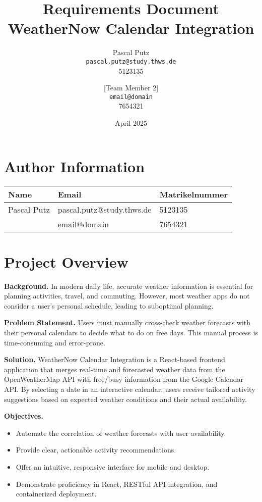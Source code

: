 \documentclass[12pt,a4paper]{article}
\title{Requirements Document\\\large WeatherNow Calendar Integration}
\author{
  Pascal Putz \\ \texttt{pascal.putz@study.thws.de} \\ 5123135
  \and
  [Team Member 2] \\ \texttt{email@domain} \\ 7654321
}
\date{April 2025}
\begin{document}
\maketitle

\section{Author Information}
\begin{longtable}{|p{5cm}|p{6cm}|p{3cm}|}
\hline
\textbf{Name} & \textbf{Email} & \textbf{Matrikelnummer} \\
\hline
Pascal Putz & pascal.putz@study.thws.de & 5123135 \\
\hline
[Team Member 2] & email@domain & 7654321 \\
\hline
\end{longtable}



\section{Project Overview}
\textbf{Background.} In modern daily life, accurate weather information is essential for planning activities, travel, and commuting. However, most weather apps do not consider a user’s personal schedule, leading to suboptimal planning.

\textbf{Problem Statement.} Users must manually cross‐check weather forecasts with their personal calendars to decide what to do on free days. This manual process is time-consuming and error-prone.

\textbf{Solution.} WeatherNow Calendar Integration is a React-based frontend application that merges real-time and forecasted weather data from the OpenWeatherMap API with free/busy information from the Google Calendar API. By selecting a date in an interactive calendar, users receive tailored activity suggestions based on expected weather conditions and their actual availability.

\textbf{Objectives.}
\begin{itemize}[nosep]
  \item Automate the correlation of weather forecasts with user availability.
  \item Provide clear, actionable activity recommendations.
  \item Offer an intuitive, responsive interface for mobile and desktop.
  \item Demonstrate proficiency in React, RESTful API integration, and containerized deployment.
\end{itemize}
\end{document}
